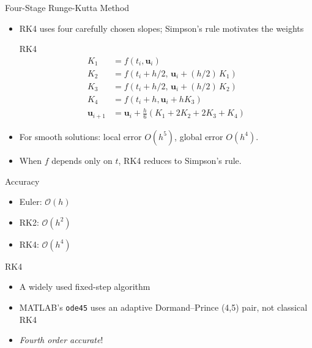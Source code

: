 \documentclass[10pt]{beamer}
\begin{document}
\begin{frame}{Four-Stage Runge-Kutta Method}
\begin{itemize}
    \item RK4 uses four carefully chosen slopes; Simpson's rule motivates the weights

    \begin{block}{RK4}
    \begin{align*}
    K_1 &= f(t_i,\textbf{u}_i)\\
    K_2 &= f(t_i + h/2,\, \textbf{u}_i + (h/2)\, K_1)\\
    K_3 &= f(t_i + h/2,\, \textbf{u}_i + (h/2)\, K_2)\\
    K_4 &= f(t_i + h, \textbf{u}_i + h K_3)\\
    \textbf{u}_{i+1} &= \textbf{u}_i +\frac{h}{6}(K_1 + 2K_2 + 2 K_3 + K_4)
    \end{align*}
    \end{block}

\item For smooth solutions: local error $O(h^5)$, global error $O(h^4)$.
\item When $f$ depends only on $t$, RK4 reduces to Simpson's rule.
\end{itemize}

\end{frame}

\begin{frame}{Accuracy}

\begin{itemize}
\item Euler: $\mathcal{O}(h)$
\vfill 
\item RK2: $\mathcal{O}(h^2)$
\vfill 
\item RK4: $\mathcal{O}(h^4)$

\end{itemize}

\vspace{3mm}


\end{frame}

\begin{frame}{RK4}

\begin{itemize}
    \item A widely used fixed-step algorithm
    \item MATLAB's \texttt{ode45} uses an adaptive Dormand--Prince (4,5) pair, not classical RK4
    \item \textit{Fourth order accurate}!
\end{itemize}
\end{frame}
\end{document}
